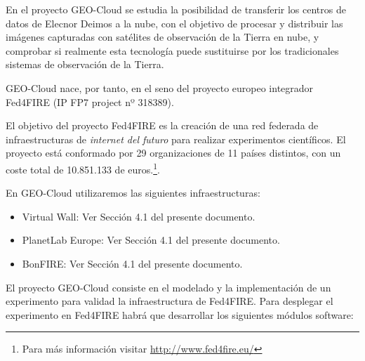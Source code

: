 En el proyecto GEO-Cloud se estudia la posibilidad de transferir los centros de datos de Elecnor Deimos a la nube, con el objetivo de procesar y distribuir las imágenes capturadas con satélites de observación de la Tierra en nube, y comprobar si realmente esta tecnología puede sustituirse por los tradicionales sistemas de observación de la Tierra.

GEO-Cloud nace, por tanto, en el seno del proyecto europeo integrador Fed4FIRE\cite{F4F} (IP FP7 project nº 318389).

El objetivo del proyecto Fed4FIRE es la creación de una red federada de infraestructuras de \emph{internet del futuro} para realizar experimentos científicos.  El proyecto está conformado por 29 organizaciones de 11 países distintos, con un coste total de 10.851.133 de euros.\footnote{Para más información visitar \url{http://www.fed4fire.eu/}}.

En GEO-Cloud  utilizaremos las siguientes infraestructuras:
\begin{itemize}
\item Virtual Wall\cite{VW}: Ver Sección 4.1 del presente documento.
\item PlanetLab Europe\cite{PLE}: Ver Sección 4.1 del presente documento.
\item BonFIRE\cite{BF}: Ver Sección 4.1 del presente documento.
\end{itemize}

El proyecto GEO-Cloud consiste en el modelado y la implementación de un experimento para validad la infraestructura de Fed4FIRE. Para desplegar el experimento en Fed4FIRE habrá que desarrollar los siguientes módulos software:

